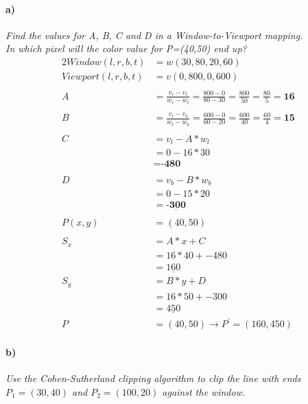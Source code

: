 \documentclass[12pt,fleqn,reqno]{article}
\begin{document}
\paragraph{a)}
\emph{Find the values for A, B, C and D in a Window-to-Viewport mapping.\\
In which pixel will the color value for P=(40,50) end up?}
\begin{alignat*}{2}
Window(l, r, b, t) &= w(30, 80, 20, 60)\\
Viewport(l, r, b, t) &=  v(0, 800, 0, 600) \\
	\\
	A 	&= \frac{v_r - v_l} { w_r - w_l} = \frac{800 - 0} { 80 - 30} = \frac{800} { 50} = \frac{80} { 5} = \textbf{16}
		\\
		\\
	B 	&= \frac{v_t - v_b} { w_t - w_b} = \frac{600 - 0} { 60 - 20} = \frac{600} { 40} = \frac{60} { 4} = \textbf{15}
	\\
	\\
	C	&= v_l - A * w_l\\
		&= 0 -16 * 30\\
		&= \textbf{-480}\\
	\\
	D	&= v_b - B * w_b\\
		&= 0 - 15 * 20\\
		&=\underline{\textbf{-300}}\\
	\\
	P(x,y) &= (40,50)
	\\
	\\
	S_x	&= A * x + C\\
		&= 16 * 40 + -480\\
		&= \underline{160}
	\\
	S_y	&= B * y + D\\
		&= 16 * 50 + -300\\
		&= \underline{450}
	\\
	P	&= (40,50) \to P^{'} = (160,450)
\end{alignat*}

\paragraph{b)}
\emph{Use the Cohen-Sutherland clipping algorithm to clip the line with ends \(P_1=(30, 40)\) and \(P_2=(100, 20)\) against the window.}
\end{document}
